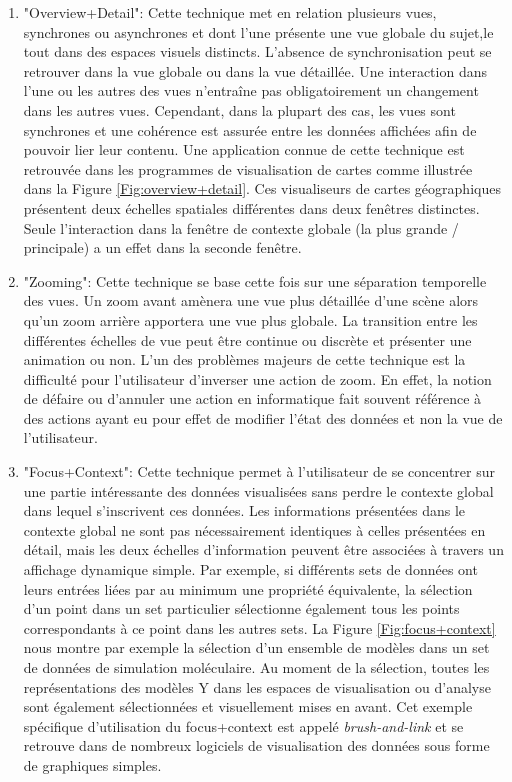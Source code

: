 \begin{enumerate}
    \item "Overview+Detail": Cette technique met en relation plusieurs vues, synchrones ou asynchrones et dont l'une présente une vue globale du sujet,le tout dans des espaces visuels distincts. L'absence de synchronisation peut se retrouver dans la vue globale ou dans la vue détaillée. Une interaction dans l'une ou les autres des vues n'entraîne pas obligatoirement un changement dans les autres vues. Cependant, dans la plupart des cas, les vues sont synchrones et une cohérence est assurée entre les données affichées afin de pouvoir lier leur contenu. Une application connue de cette technique est retrouvée dans les programmes de visualisation de cartes comme illustrée dans la Figure \ref{Fig:overview+detail}. Ces visualiseurs de cartes géographiques présentent deux échelles spatiales différentes dans deux fenêtres distinctes. Seule l'interaction dans la fenêtre de contexte globale (la plus grande / principale) a un effet dans la seconde fenêtre.
    \item "Zooming": Cette technique se base cette fois sur une séparation temporelle des vues. Un zoom avant amènera une vue plus détaillée d'une scène alors qu'un zoom arrière apportera une vue plus globale. La transition entre les différentes échelles de vue peut être continue ou discrète et présenter une animation ou non. L'un des problèmes majeurs de cette technique est la difficulté pour l'utilisateur d'inverser une action de zoom. En effet, la notion de défaire ou d'annuler une action en informatique fait souvent référence à des actions ayant eu pour effet de modifier l'état des données et non la vue de l'utilisateur.
    \item "Focus+Context": Cette technique permet à l'utilisateur de se concentrer sur une partie intéressante des données visualisées sans perdre le contexte global dans lequel s'inscrivent ces données. Les informations présentées dans le contexte global ne sont pas nécessairement identiques à celles présentées en détail, mais les deux échelles d'information peuvent être associées à travers un affichage dynamique simple. Par exemple, si différents sets de données ont leurs entrées liées par au minimum une propriété équivalente, la sélection d'un point dans un set particulier sélectionne également tous les points correspondants à ce point dans les autres sets. La Figure \ref{Fig:focus+context} nous montre par exemple la sélection d'un ensemble de modèles dans un set de données de simulation moléculaire. Au moment de la sélection, toutes les représentations des modèles Y dans les espaces de visualisation ou d'analyse sont également sélectionnées et visuellement mises en avant. Cet exemple spécifique d'utilisation du focus+context est appelé \textit{brush-and-link} et se retrouve dans de nombreux logiciels de visualisation des données sous forme de graphiques simples.

\end{enumerate}
